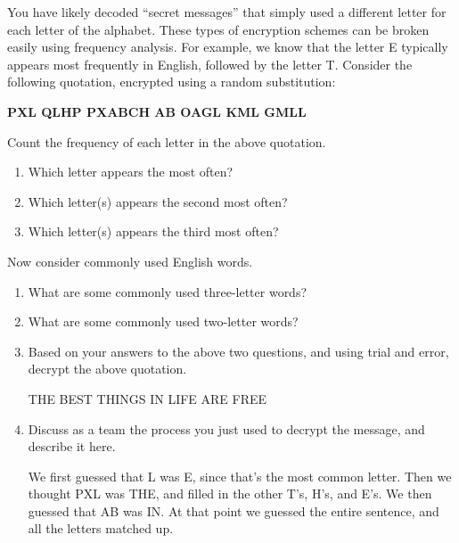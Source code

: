 

You have likely decoded ``secret messages'' that simply used a different letter for each letter of the alphabet.
These types of encryption schemes can be broken easily using frequency analysis.
For example, we know that the letter E typically appears most frequently in English, followed by the letter T.
Consider the following quotation, encrypted using a random substitution:

\begin{center}
\bf PXL QLHP PXABCH AB OAGL KML GMLL
\end{center}




\Q Count the frequency of each letter in the above quotation.

\begin{enumerate}

\item Which letter appears the most often? 

\item Which letter(s) appears the second most often? 

\item Which letter(s) appears the third most often? 

\end{enumerate}


\Q Now consider commonly used English words.

\begin{enumerate}

\item What are some commonly used three-letter words? 

\item What are some commonly used two-letter words? 

\item Based on your answers to the above two questions, and using trial and error, decrypt the above quotation.

\begin{answer}[2em]
\begin{center}
THE BEST THINGS IN LIFE ARE FREE
\end{center}
\end{answer}

\item Discuss as a team the process you just used to decrypt the message, and describe it here.

\begin{answer}[5em]
We first guessed that L was E, since that's the most common letter.
Then we thought PXL was THE, and filled in the other T's, H's, and E's.
We then guessed that AB was IN.
At that point we guessed the entire sentence, and all the letters matched up.
\end{answer}

\end{enumerate}
